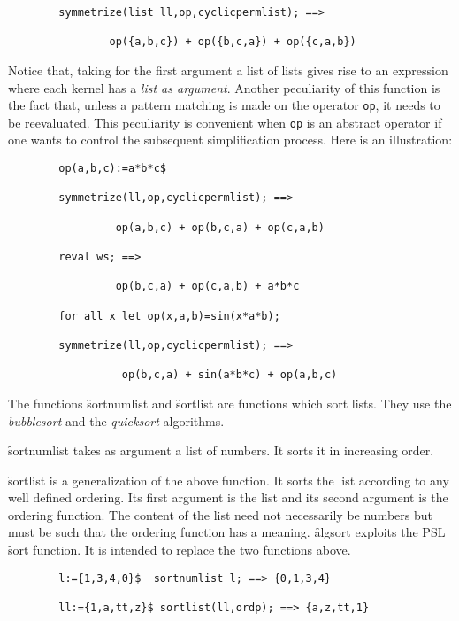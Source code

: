\begin{itemize}
\begin{verbatim}
        symmetrize(list ll,op,cyclicpermlist); ==>

                op({a,b,c}) + op({b,c,a}) + op({c,a,b})
\end{verbatim}
Notice that, taking for the first argument a list of lists gives rise to
an expression where  each kernel has a \emph{list as argument}. Another
peculiarity of this function is the fact that, unless a pattern matching is
made on the operator \texttt{op}, it needs to be reevaluated. This peculiarity
is convenient when \texttt{op} is an abstract operator if one wants to 
control the subsequent simplification process. Here is an illustration:
\begin{verbatim}
        op(a,b,c):=a*b*c$

        symmetrize(ll,op,cyclicpermlist); ==>

                 op(a,b,c) + op(b,c,a) + op(c,a,b)

        reval ws; ==>
                 
                 op(b,c,a) + op(c,a,b) + a*b*c

        for all x let op(x,a,b)=sin(x*a*b);

        symmetrize(ll,op,cyclicpermlist); ==>

                  op(b,c,a) + sin(a*b*c) + op(a,b,c)
\end{verbatim}
\hypertarget{operator:SORTNUMLIST}{}
\hypertarget{operator:SORTLIST}{}
The functions \f{sortnumlist} and \f{sortlist} are functions which sort
lists. They use the \emph{bubblesort} and the \emph{quicksort} algorithms.

\f{sortnumlist} takes as argument a list of numbers. It sorts it in
increasing order.

\f{sortlist} is a generalization of the above function.
It sorts the list according
to any well defined ordering. Its first argument is the list and its
second argument is the ordering function. The content of the list
need not necessarily be numbers but must be such that the ordering function
has a meaning.
\hypertarget{operator:ALGSORT}{}
\f{algsort} exploits the PSL \f{sort} function. It is intended to replace
the two functions above.
\begin{verbatim}
        l:={1,3,4,0}$  sortnumlist l; ==> {0,1,3,4}

        ll:={1,a,tt,z}$ sortlist(ll,ordp); ==> {a,z,tt,1}


\end{verbatim}
\end{itemize}
